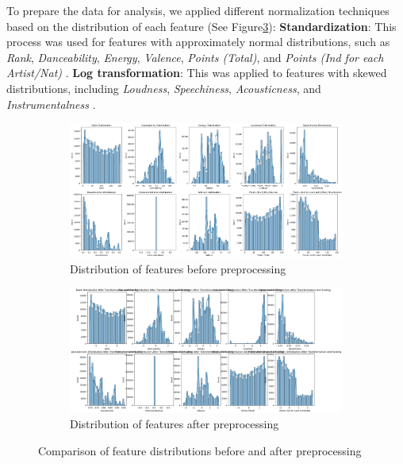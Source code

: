 \documentclass{article}
\begin{document}
To prepare the data for analysis, we applied different normalization techniques based on the distribution of each feature (See Figure\ref{fig:preprocessing_comparison}):
\textbf{Standardization}: This process was used for features with approximately normal distributions, such as \textit{Rank}, \textit{Danceability}, \textit{Energy}, \textit{Valence}, \textit{Points (Total)}, and \textit{Points (Ind for each Artist/Nat)} \cite{standardization_source}.
 \textbf{Log transformation}: This was applied to features with skewed distributions, including \textit{Loudness}, \textit{Speechiness}, \textit{Acousticness}, and \textit{Instrumentalness} \cite{log_transformation_source}.
\begin{figure}[h]
    \centering
    \begin{subfigure}[b]{0.45\textwidth}
        \centering
        \includegraphics[width=\textwidth]{data_before_preprocessing.png}
        \caption{Distribution of features before preprocessing}
        \label{fig:before_preprocessing}
    \end{subfigure}
    \hfill
    \begin{subfigure}[b]{0.45\textwidth}
        \centering
        \includegraphics[width=\textwidth]{data_after_preprocessing.png}
        \caption{Distribution of features after preprocessing}
        \label{fig:after_preprocessing}
    \end{subfigure}
    \caption{Comparison of feature distributions before and after preprocessing}
    \label{fig:preprocessing_comparison}
\end{figure}
\end{document}
